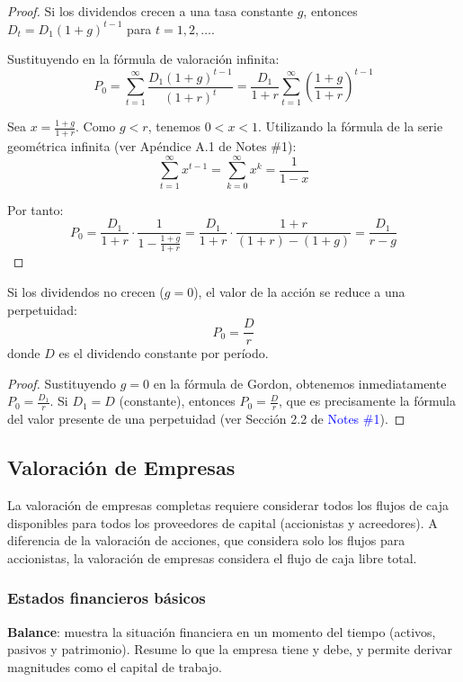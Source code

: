 \begin{proof}
Si los dividendos crecen a una tasa constante $g$, entonces $D_t = D_1(1+g)^{t-1}$ para $t = 1, 2, \ldots$.

Sustituyendo en la fórmula de valoración infinita:
$$P_0 = \sum_{t=1}^{\infty} \frac{D_1(1+g)^{t-1}}{(1+r)^t} = \frac{D_1}{1+r} \sum_{t=1}^{\infty} \left(\frac{1+g}{1+r}\right)^{t-1}$$

Sea $x = \frac{1+g}{1+r}$. Como $g < r$, tenemos $0 < x < 1$. Utilizando la fórmula de la serie geométrica infinita (ver Apéndice A.1 de Notes \#1):
$$\sum_{t=1}^{\infty} x^{t-1} = \sum_{k=0}^{\infty} x^k = \frac{1}{1-x}$$

Por tanto:
$$P_0 = \frac{D_1}{1+r} \cdot \frac{1}{1 - \frac{1+g}{1+r}} = \frac{D_1}{1+r} \cdot \frac{1+r}{(1+r) - (1+g)} = \frac{D_1}{r - g}$$
\end{proof}

\begin{proposicion}
Si los dividendos no crecen ($g = 0$), el valor de la acción se reduce a una perpetuidad:
\begin{equation}
P_0 = \frac{D}{r}
\end{equation}
donde $D$ es el dividendo constante por período.
\end{proposicion}

\begin{proof}
Sustituyendo $g = 0$ en la fórmula de Gordon, obtenemos inmediatamente $P_0 = \frac{D_1}{r}$. Si $D_1 = D$ (constante), entonces $P_0 = \frac{D}{r}$, que es precisamente la fórmula del valor presente de una perpetuidad (ver Sección 2.2 de \textcolor{blue}{Notes \#1}).
\end{proof}

\subsection{Valoración de Empresas}

La valoración de empresas completas requiere considerar todos los flujos de caja disponibles para todos los proveedores de capital (accionistas y acreedores). A diferencia de la valoración de acciones, que considera solo los flujos para accionistas, la valoración de empresas considera el flujo de caja libre total.

\subsubsection{Estados financieros básicos}
\textbf{Balance}: muestra la situación financiera en un momento del tiempo (activos, pasivos y patrimonio). Resume lo que la empresa tiene y debe, y permite derivar magnitudes como el capital de trabajo.

